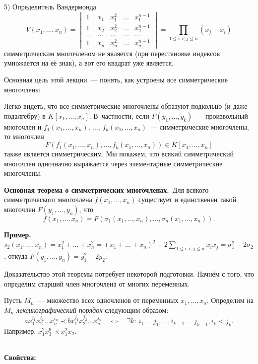 \documentclass[a4paper,10pt]{amsart}
\theoremstyle{definition}
\theoremstyle{remark}
\begin{document}
5) Определитель Вандермонда
$$
V(x_1, \ldots, x_n) =
\begin{vmatrix}
1 & x_1 & x_1^2 & \ldots & x_1^{n-1} \\
1 & x_2 & x_2^2 & \ldots & x_2^{n-1} \\
\ldots & \ldots & \ldots & \ldots & \ldots \\
1 & x_n & x_n^2 & \ldots & x_n^{n-1}
\end{vmatrix} =
\prod \limits_{1 \leqslant i < j \leqslant n} (x_j - x_i)
$$
симметрическим многочленом не является (при перестановке индексов
умножается на её знак), а вот его квадрат уже является.

Основная цель этой лекции~--- понять, как устроены все
симметрические многочлены.

Легко видеть, что все симметрические многочлены образуют подкольцо
(и даже подалгебру) в $K[x_1, \ldots, x_n]$. В~частности, если
$F(y_1, \ldots, y_k)$~--- произвольный многочлен и $f_1(x_1, \ldots,
x_n)$, $\ldots$, $f_k(x_1, \ldots, x_n)$~--- симметрические
многочлены, то многочлен
$$
F(f_1(x_1, \ldots, x_n), \ldots, f_k(x_1, \ldots, x_n)) \in K[x_1,
\ldots, x_n]
$$
также является симметрическим. Мы покажем, что всякий симметрический
многочлен однозначно выражается через элементарные симметрические
многочлены.

\medskip

{\bf Основная теорема о симметрических многочленах.}\ Для всякого
симметрического многочлена $f(x_1, \ldots, x_n)$ существует и
единственен такой многочлен $F(y_1, \ldots, y_n)$, что
$$
f(x_1, \ldots, x_n) = F(\sigma_1(x_1, \ldots, x_n), \ldots,
\sigma_n(x_1, \ldots, x_n)).
$$

\textbf{Пример.} $s_2(x_1, \ldots, x_n) = x_1^2 + \ldots + x_n^2 =
(x_1 + \ldots + x_n)^2 - 2\sum \limits_{1 \leqslant i < j \leqslant
n} x_i x_j = \sigma_1^2 - 2\sigma_2$, откуда $F(y_1, \ldots, y_n) =
y_1^2 - 2y_2$.


Доказательство этой теоремы потребует некоторой подготовки. Начнём с
того, что определим старший член многочлена от многих переменных.

Пусть $M_n$~--- множество всех одночленов от переменных $x_1,
\ldots, x_n$. Определим на $M_n$ {\it лексикографический порядок}
следующим образом:
$$
ax_1^{i_1}x_2^{i_2}\ldots x_n^{i_n} \prec bx_1^{j_1}x_2^{j_2}\ldots
x_n^{j_n} \quad \Leftrightarrow \quad \exists k: \: i_1=j_1,\ldots,
i_{k-1}=j_{k-1}, i_k<j_k.
$$
Например, $x_1^2x_3^9 \prec x_1^2x_2$.

\ \\
\textbf{Свойства:}
\end{document}
